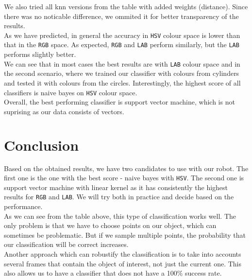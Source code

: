 \documentclass[12pt,a4paper]{article}
\begin{document}
	We also tried all knn versions from the table with added weights (distance). Since there was no noticable difference, we ommited it for better transparency of the results. \\

	As we have predicted, in general the accuracy in \texttt{HSV} colour space is lower than that in the \texttt{RGB} space. As expected, \texttt{RGB} and \texttt{LAB} perform similarly, but the \texttt{LAB} performs slightly better. \\

	We can see that in most cases the best results are with \texttt{LAB} colour space and in the second scenario, where we trained our classifier with colours from cylinders and tested it with colours from the circles. Interestingly, the highest score of all classifiers is naive bayes on \texttt{HSV} colour space. \\

	Overall, the best performing classifier is support vector machine, which is not suprising as our data consists of vectors.
	
	\section{Conclusion}

	Based on the obtained results, we have two candidates to use with our robot. The first one is the one with the best score - naive bayes with \texttt{HSV}. The second one is support vector machine with linear kernel as it has consistently the highest results for \texttt{RGB} and \texttt{LAB}. We will try both in practice and decide based on the performance. \\
	
	As we can see from the table above, this type of classification works well. The only problem is that we have to choose points on our object, which can sometimes be problematic. But if we sample multiple points, the probability that our classification will be correct increases. \\

	Another approach which can robustify the classification is to take into accounts several frames that contain the object of interest, not just the current one. This also allows us to have a classifier that does not have a 100\% success rate.
\end{document}
